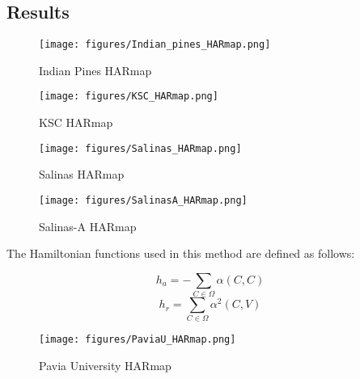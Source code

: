 
\subsection{Results}

\begin{figure}[htbp]
    \centering
    \begin{minipage}{0.45\textwidth}
        \centering
        \texttt{[image: figures/Indian\_pines\_HARmap.png]}
        \caption{Indian Pines HARmap}
        \label{fig:indian_pines_har}
    \end{minipage}\hfill
    \begin{minipage}{0.45\textwidth}
        \centering
        \texttt{[image: figures/KSC\_HARmap.png]}
        \caption{KSC HARmap}
        \label{fig:ksc_har}
    \end{minipage}
\end{figure}

\begin{figure}[htbp]
    \centering
    \begin{minipage}{0.45\textwidth}
        \centering
        \texttt{[image: figures/Salinas\_HARmap.png]}
        \caption{Salinas HARmap}
        \label{fig:salinas_har}
    \end{minipage}\hfill
    \begin{minipage}{0.45\textwidth}
        \centering
        \texttt{[image: figures/SalinasA\_HARmap.png]}
        \caption{Salinas-A HARmap}
        \label{fig:salinasa_har}
    \end{minipage}
\end{figure}

The Hamiltonian functions used in this method are defined as follows:

\[
h_a = - \sum_{C \in \Omega} \alpha(C, C)
\]
\[
h_r = \sum_{C \in \Omega} \alpha^2(C, V)
\]


\begin{figure}[htbp]
    \centering
    \begin{minipage}{0.45\textwidth}
        \centering
        \texttt{[image: figures/PaviaU\_HARmap.png]}
        \caption{Pavia University HARmap}
        \label{fig:pavia_university_har}
    \end{minipage}\hfill
    \begin{minipage}{0.45\textwidth}
    \end{minipage}
\end{figure}

